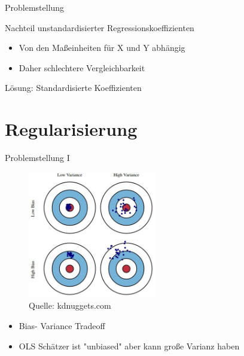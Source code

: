\documentclass[10pt]{beamer}
\begin{document}
\begin{frame}{Problemstellung}
	
	\begin{Large}{Nachteil unstandardisierter Regressionskoeffizienten}\end{Large}
	
	  \begin{itemize}
		\item Von den Maßeinheiten für X und Y abhängig
		\item Daher schlechtere Vergleichbarkeit
	  \end{itemize}
	 
	\begin{Large}{Lösung: Standardisierte Koeffizienten}\end{Large}
	  
	
\end{frame}

\section{Regularisierung}

\begin{frame}{Problemstellung I}
        \begin{figure}
            \centering
                \includegraphics[width=0.5\textwidth, keepaspectratio]{figures/bias-and-variance.jpg}
            \caption{Quelle: kdnuggets.com}
         \end{figure}
    
        \begin{itemize}
            \item Bias- Variance Tradeoff
            \item OLS Schätzer ist "unbiased" aber kann große Varianz haben
        \end{itemize}
    
\end{frame}
\end{document}
